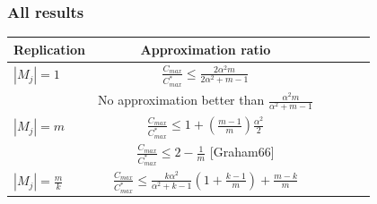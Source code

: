 \documentclass[usenames,dvipsnames]{beamer}
\begin{document}
\begin{frame}
  \frametitle{All results}
  
  \begin{center}

    \begin{tabular}{|l|c|c|c|c|c|}
      \hline
      Replication & Approximation ratio  \\
      \hline
      $|M_j|=1$ & $\frac{C_{max}}{C_{max}^{*}}\leq \frac{2\alpha^{2}m}{2\alpha^{2}+ m-1}$ \\
      & No approximation better than $\frac{\alpha^{2}m }{\alpha^{2} + m-1}$  \\
      
      \hline
      $|M_j|=m$ & $\frac{C_{max}}{C_{max}^{*}} \leq 1 + (\frac{m-1}{m})\frac{\alpha^{2}}{2}$  \\
      & $\frac{C_{max}}{C_{max}^{*}} \leq 2-\frac{1}{m}$ [Graham66]   \\
      \hline
      
      $|M_j|= \frac{m}{k} $ & $\frac{C_{max}}{C_{max}^{*}} \leq \frac{k\alpha^{2}}{\alpha^{2}+k-1} \left(1+ {\frac{k-1}{m}} \right)+ {\frac{m-k}{m}}$ \\
      
      \hline
    \end{tabular}
  \end{center}
\end{frame}
\end{document}
